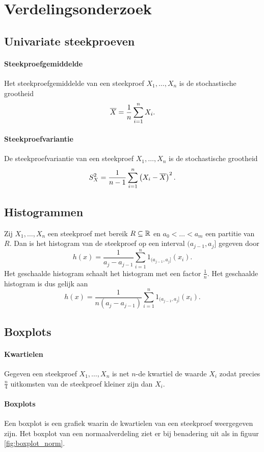 \section{Verdelingsonderzoek}
\subsection{Univariate steekproeven}
\paragraph{Steekproefgemiddelde} Het steekproefgemiddelde van een steekproef \(X_{1},\dots,X_{n}\) is de stochastische grootheid
\[
    \overline{X}=\frac{1}{n}\sum_{i=1}^{n}X_{i}.
\]

\paragraph{Steekproefvariantie} De steekproefvariantie van een steekproef \(X_{1},\dots,X_{n}\) is de stochastische grootheid
\[
    S_{X}^{2}=\frac{1}{n-1}\sum_{i=1}^{n}\left(X_{i}-\overline{X}\right)^{2}.
\]

\subsection{Histogrammen}
Zij \(X_{1},\dots,X_{n}\) een steekproef met bereik \(R\subseteq\mathbb{R}\) en \(a_{0}<\dots<a_{m}\) een partitie van \(R\). Dan is het histogram van de steekproef op een interval \((a_{j-1},a_{j}]\) gegeven door
\[
    h(x)=\frac{1}{a_{j}-a_{j-1}}\sum_{i=1}^{n}1_{(a_{j-1},a_{j}]}(x_{i}).
\]
Het geschaalde histogram schaalt het histogram met een factor \(\frac{1}{n}\). Het geschaalde histogram is dus gelijk aan
\[
    h(x)=\frac{1}{n(a_{j}-a_{j-1})}\sum_{i=1}^{n}1_{(a_{j-1},a_{j}]}(x_{i}).
\]

\subsection{Boxplots}
\paragraph{Kwartielen} Gegeven een steekproef \(X_{1},\dots,X_{n}\) is net \(n\)-de kwartiel de waarde \(X_{i}\) zodat precies \(\frac{n}{4}\) uitkomsten van de steekproef kleiner zijn dan \(X_{i}\).

\paragraph{Boxplots} Een boxplot is een grafiek waarin de kwartielen van een steekproef weergegeven zijn. Het boxplot van een normaalverdeling ziet er bij benadering uit als in figuur \ref{fig:boxplot_norm}.

